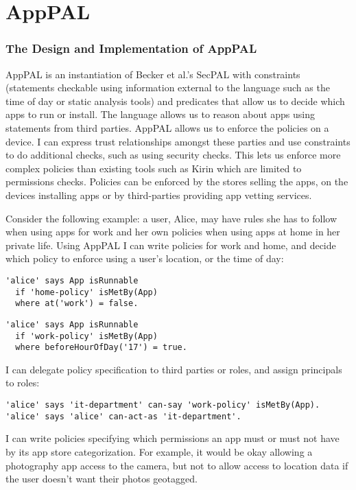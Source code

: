 \documentclass[thesis.tex]{subfiles}
\begin{document}
\chapter{AppPAL}

\subsection{The Design and Implementation of AppPAL}

AppPAL is an instantiation of Becker et al.'s SecPAL\cite{becker_secpal:_2010} with constraints (statements checkable using information external to the language such as the time of day or static analysis tools) and predicates that allow us to decide which apps to run or install.
The language allows us to reason about apps using statements from third parties. AppPAL allows us to enforce the policies on a device.
I can express trust relationships amongst these parties and use constraints to do additional checks, such as using security checks.
This lets us enforce more complex policies than existing tools such as Kirin which are limited to permissions checks. 
Policies can be enforced by the stores selling the apps, on the devices installing apps or by third-parties providing app vetting services.

Consider the following example:
  a user, Alice, may have rules she has to follow when using apps for work and her own policies when using apps at home in her private life.
Using AppPAL I can write policies for work and home, and decide which policy to enforce using a user's location, or the time of day:

\begin{lstlisting}
'alice' says App isRunnable
  if 'home-policy' isMetBy(App)
  where at('work') = false.
\end{lstlisting}
\begin{lstlisting}
'alice' says App isRunnable
  if 'work-policy' isMetBy(App)
  where beforeHourOfDay('17') = true.
\end{lstlisting}

I can delegate policy specification to third parties or roles, and assign principals to roles:

\begin{lstlisting}
'alice' says 'it-department' can-say 'work-policy' isMetBy(App).
'alice' says 'alice' can-act-as 'it-department'.
\end{lstlisting}

I can write policies specifying which permissions an app must or must not have by its app store categorization.
For example, it would be okay allowing a photography app access to the camera, but not to allow access to location data if the user doesn't want their photos geotagged.
\end{document}
